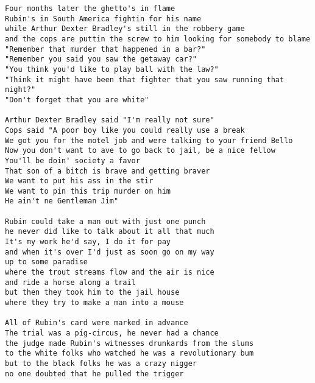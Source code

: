 \documentclass[a4paper]{article}
\begin{document}
\begin{Verbatim}[commandchars=\\\{\}]
Four months later the ghetto's in flame
Rubin's in South America fightin for his name
while Arthur Dexter Bradley's still in the robbery game
and the cops are puttin the screw to him looking for somebody to blame
"Remember that murder that happened in a bar?"
"Remember you said you saw the getaway car?"
"You think you'd like to play ball with the law?"
"Think it might have been that fighter that you saw running that night?"
"Don't forget that you are white"

Arthur Dexter Bradley said "I'm really not sure"
Cops said "A poor boy like you could really use a break
We got you for the motel job and were talking to your friend Bello
Now you don't want to ave to go back to jail, be a nice fellow
You'll be doin' society a favor
That son of a bitch is brave and getting braver
We want to put his ass in the stir
We want to pin this trip murder on him
He ain't ne Gentleman Jim"

Rubin could take a man out with just one punch
he never did like to talk about it all that much
It's my work he'd say, I do it for pay
and when it's over I'd just as soon go on my way
up to some paradise
where the trout streams flow and the air is nice
and ride a horse along a trail
but then they took him to the jail house
where they try to make a man into a mouse

All of Rubin's card were marked in advance
The trial was a pig-circus, he never had a chance
the judge made Rubin's witnesses drunkards from the slums
to the white folks who watched he was a revolutionary bum
but to the black folks he was a crazy nigger
no one doubted that he pulled the trigger

\end{Verbatim}
\newpage
\end{document}
